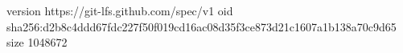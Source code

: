 version https://git-lfs.github.com/spec/v1
oid sha256:d2b8c4ddd67fdc227f50f019cd16ac08d35f3ce873d21c1607a1b138a70c9d65
size 1048672
